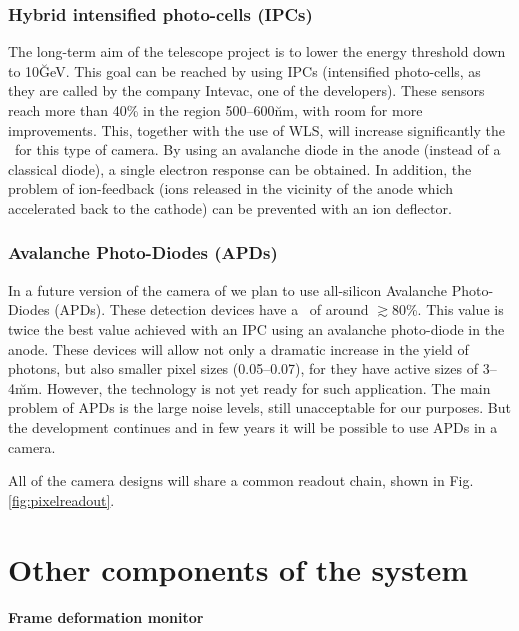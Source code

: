 \subsubsection{Hybrid intensified photo-cells (IPCs)}
%
The long-term aim of the telescope project is to lower the energy
threshold down to 10\u{GeV}. This goal can be reached by using IPCs
(intensified photo-cells, as they are called by the company Intevac,
one of the developers). These sensors reach more than 40\% \QE in the
region 500--600\u{nm}, with room for more improvements. This, together
with the use of WLS, will increase significantly the \QEeff\ for this
type of camera. By using an avalanche diode in the anode (instead of a
classical diode), a single electron response can be obtained. In
addition, the problem of ion-feedback (ions released in the vicinity
of the anode which accelerated back to the cathode) can be prevented
with an ion deflector.

\subsubsection{Avalanche Photo-Diodes (APDs)}
%
In a future version of the camera of \MAGIC we plan to use all-silicon
Avalanche Photo-Diodes (APDs). These detection devices have a \QEeff\ 
of around $\gtrsim$80\%. This value is twice the best value achieved with
an IPC using an avalanche photo-diode in the anode. These devices will
allow not only a dramatic increase in the yield of \Cherenkov photons,
but also smaller pixel sizes (0.05\deg--0.07\deg), for they have
active sizes of 3--4\u{mm}. However, the technology is not yet ready
for such application. The main problem of APDs is the large noise
levels, still unacceptable for our purposes. But the development
continues and in few years it will be possible to use APDs in a \MAGIC
camera.

\bigskip

All of the camera designs will share a common readout chain, shown in
Fig.\ref{fig:pixelreadout}.

\MORE%

\section{Other components of the system}

\paragraph{Frame deformation monitor}

